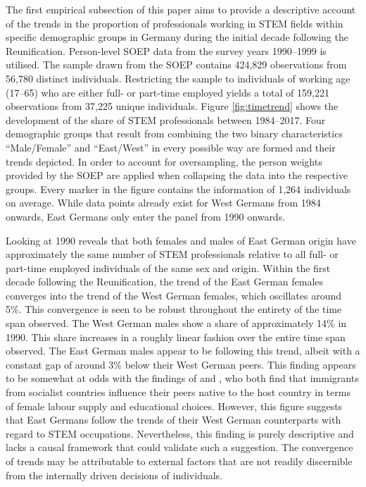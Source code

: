\documentclass[a4paper, oneside, hyperfootnotes = false]{article}
\begin{document}
{The first empirical subsection of this paper aims to provide a descriptive account of the trends in the proportion of professionals working in STEM fields within specific demographic groups in Germany during the initial decade following the Reunification.
Person-level SOEP data from the survey years 1990--1999 is utilised.
The sample drawn from the SOEP contains 424,829 observations from 56,780 distinct individuals.
Restricting the sample to individuals of working age (17--65) who are either full- or part-time employed yields a total of 159,221 observations from 37,225 unique individuals.
Figure \ref{fig:timetrend} shows the development of the share of STEM professionals between 1984--2017.
Four demographic groups that result from combining the two binary characteristics ``Male/Female'' and ``East/West'' in every possible way are formed and their trends depicted.
In order to account for oversampling, the person weights provided by the SOEP are applied when collapsing the data into the respective groups.
Every marker in the figure contains the information of 1,264 individuals on average.
While data points already exist for West Germans from 1984 onwards, East Germans only enter the panel from 1990 onwards.

Looking at 1990 reveals that both females and males of East German origin have approximately the same number of STEM professionals relative to all full- or part-time employed individuals of the same sex and origin.
Within the first decade following the Reunification, the trend of the East German females converges into the trend of the West German females, which oscillates around 5\%.
This convergence is seen to be robust throughout the entirety of the time span observed.
The West German males show a share of approximately 14\% in 1990.
This share increases in a roughly linear fashion over the entire time span observed.
The East German males appear to be following this trend, albeit with a constant gap of around 3\% below their West German peers.
This finding appears to be somewhat at odds with the findings of \cite{Jessen2023} and \cite{FriedmanSokuler2020}, who both find that immigrants from socialist countries influence their peers native to the host country in terms of female labour supply and educational choices.
However, this figure suggests that East Germans follow the trends of their West German counterparts with regard to STEM occupations.
Nevertheless, this finding is purely descriptive and lacks a causal framework that could validate such a suggestion.
The convergence of trends may be attributable to external factors that are not readily discernible from the internally driven decisions of individuals.

}
\end{document}
